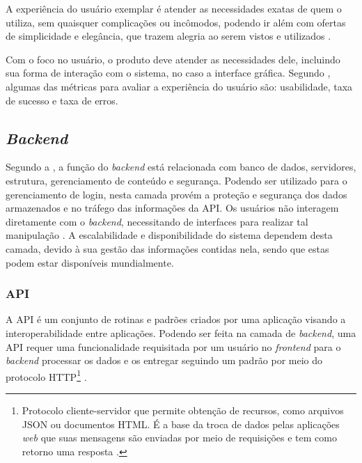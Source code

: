 A experiência do usuário exemplar é atender as necessidades exatas de quem o utiliza, sem quaisquer complicações ou incômodos, podendo ir além com ofertas de simplicidade e elegância, que trazem alegria ao serem vistos e utilizados \cite{NORMAN}. 


Com o foco no usuário, o produto deve atender as necessidades dele, incluindo sua forma de interação com o sistema, no caso a interface gráfica. Segundo , algumas das métricas para avaliar a experiência do usuário são: usabilidade, taxa de sucesso e taxa de erros.


\subsection{\textit{Backend}}
Segundo a , a função do \textit{backend} está relacionada com banco de dados, servidores, estrutura, gerenciamento de conteúdo e segurança. Podendo ser utilizado para o gerenciamento de login, nesta camada provém a proteção e segurança dos dados armazenados e no tráfego das informações da API. Os usuários não interagem diretamente com o \textit{backend}, necessitando de interfaces para realizar tal manipulação \cite{SOUTO}. A escalabilidade e disponibilidade do sistema dependem desta camada, devido à sua gestão das informações contidas nela, sendo que estas podem estar disponíveis mundialmente.

\subsubsection{API}
A API é um conjunto de rotinas e padrões criados por uma aplicação visando a interoperabilidade entre aplicações. Podendo ser feita na camada de \textit{backend}, uma API requer uma funcionalidade requisitada por um usuário no \textit{frontend} para o \textit{backend} processar os dados e os entregar seguindo um padrão por meio do protocolo HTTP\footnote{Protocolo cliente-servidor que permite obtenção de recursos, como arquivos JSON ou documentos HTML. É a base da troca de dados pelas aplicações \textit{web} que suas mensagens são enviadas por meio de requisições e tem como retorno uma resposta \cite{HTTP}.} \cite{BEECODE}.

